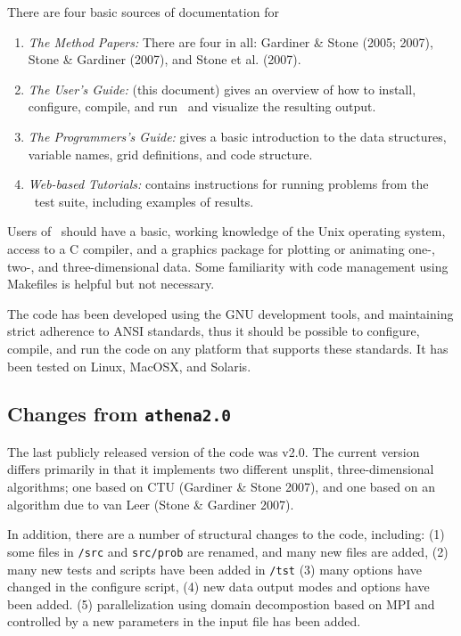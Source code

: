 There are four basic sources of documentation for \ath
\begin{enumerate}

\item {\it The Method Papers:} There are four in all: Gardiner \& Stone
(2005; 2007), Stone \& Gardiner (2007), and Stone et al. (2007).

\item {\it The User's Guide:} (this document) gives an overview of how to
install, configure, compile, and run \ath\ and visualize the resulting output.

\item {\it The Programmers's Guide:} gives a basic introduction to the 
data structures, variable names, grid definitions, and code structure.

\item {\it Web-based Tutorials:} contains instructions
for running problems from the \ath\ test suite, including examples of results.

\end{enumerate}
Users of \ath\ should have a basic, working knowledge of the Unix
operating system, access to a C compiler, and a graphics package for
plotting or animating one-, two-, and three-dimensional data.  Some familiarity
with code management using Makefiles is helpful but not necessary.

The code has been developed using the GNU development tools, and
maintaining strict adherence to ANSI standards, thus it should be possible
to configure, compile, and run the code on any platform that supports these
standards.  It has been tested on Linux, MacOSX, and Solaris.

\subsection{Changes from {\tt athena2.0}}

The last publicly released version of the code was v2.0.  The current
version differs primarily in that it implements two different unsplit,
three-dimensional algorithms; one based on CTU (Gardiner \& Stone 2007),
and one based on an algorithm due to van Leer (Stone \& Gardiner 2007).

In addition, there are a number of structural changes to the code, including:
(1) some files in {\tt /src} and {\tt src/prob} are renamed, and many new files are added,
(2) many new tests and scripts have been added in {\tt /tst}
(3) many options have changed in the configure script,
(4) new data output modes and options have been added.
(5) parallelization using domain decompostion based on MPI and controlled
by a new parameters in the input file has been added.

